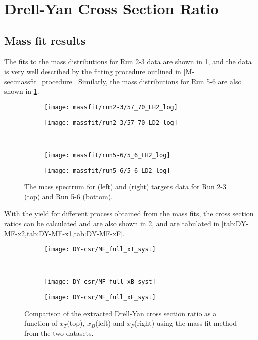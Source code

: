 \documentclass[../main.tex]{subfiles}
\begin{document}
\ifSubfilesClassLoaded{
	\mainmatter
	\setcounter{chapter}{6}
}{}

\section{Drell-Yan Cross Section Ratio}
\subsection{Mass fit results}
The fits to the mass distributions for Run 2-3 data are shown in \cref{fig:massfit_integrated}, and the
data is very well described by the fitting procedure outlined in \cref{M-sec:massfit_procedure}.
Similarly, the mass distributions for Run 5-6
are also shown in \cref{fig:massfit_integrated}.
\begin{figure}[h!]
	\begin{subfigure}{0.45\linewidth}
		\texttt{[image: massfit/run2-3/57\_70\_LH2\_log]}
	\end{subfigure}
	\begin{subfigure}{0.45\linewidth}
		\texttt{[image: massfit/run2-3/57\_70\_LD2\_log]}
	\end{subfigure}
	\\
	\begin{subfigure}{0.45\linewidth}
		\texttt{[image: massfit/run5-6/5\_6\_LH2\_log]}
	\end{subfigure}
	\begin{subfigure}{0.45\linewidth}
		\texttt{[image: massfit/run5-6/5\_6\_LD2\_log]}
	\end{subfigure}
	\caption{The mass spectrum for (left) and (right) targets data for Run 2-3 (top) and Run 5-6 (bottom).}
	\label{fig:massfit_integrated}
\end{figure}
With the yield for different process obtained from the mass fits, the cross section ratios can be calculated
and are also shown in \cref{fig:CSR_MF}, and are tabulated in \cref{tab:DY-MF-x2,tab:DY-MF-x1,tab:DY-MF-xF}.
\begin{figure}[h!]
	\centering
	\begin{subfigure}{0.6\linewidth}
		\texttt{[image: DY-csr/MF\_full\_xT\_syst]}
	\end{subfigure}\\
	\begin{subfigure}{0.45\linewidth}
		\texttt{[image: DY-csr/MF\_full\_xB\_syst]}
	\end{subfigure}
	\begin{subfigure}{0.45\linewidth}
		\texttt{[image: DY-csr/MF\_full\_xF\_syst]}
	\end{subfigure}
	\caption{Comparison of the extracted Drell-Yan cross section ratio as a function of $x_T$(top),
		$x_B$(left) and $x_F$(right) using the mass fit method from the two datasets.}
	\label{fig:CSR_MF}
\end{figure}
\end{document}
